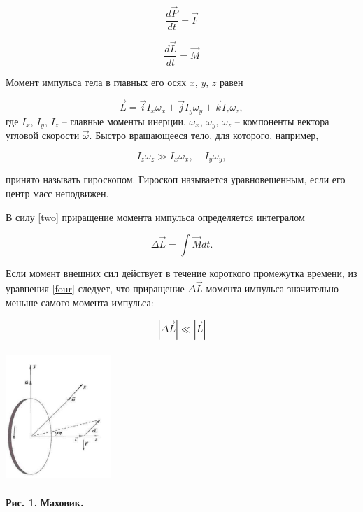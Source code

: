 \begin{equation}
\frac{d\vec{P}}{dt}=\vec{F}
\label{one}
\end{equation}

\begin{equation}
\frac{d\vec{L}}{dt}=\vec{M}
\label{two}
\end{equation}

    Момент импульса тела в главных его осях $x$, $y$, $z$ равен

\begin{equation}
\vec{L} = \vec{i}I_x\omega_x+\vec{j}I_y\omega_y+\vec{k}I_z\omega_z,
\label{three}
\end{equation}
    где $ I_x $, $ I_y $, $ I_z $ -- главные моменты инерции, $ \omega_x $, $ \omega_y $, $ \omega_z $ -- компоненты вектора угловой скорости $ \vec{\omega} $. Быстро вращающееся тело, для которого, например,

\[
I_z\omega_z \gg I_x\omega_x,\;\;\;\;I_y\omega_y,
\]

    принято называть гироскопом. Гироскоп называется уравновешенным, если его центр масс неподвижен.

    В силу \eqref{two} приращение момента импульса определяется интегралом

\begin{equation}
\Delta\vec{L} = \int\vec{M} dt.
\label{four}
\end{equation}

    Если момент внешних сил действует в течение короткого промежутка времени, из уравнения \eqref{four} следует, что приращение $ \Delta \vec{L} $ момента импульса значительно меньше самого момента импульса:

\[
\left|\Delta \vec{L}\right| \ll \left|\vec{L}\right| 
\]

\begin{center}
\includegraphics[width=4cm, height=5cm]{mahovik.jpeg}
\end{center}
\begin{flushright}
{\scriptsize \textbf{Рис. 1.} \textbf {Маховик.}}
\end{flushright}


